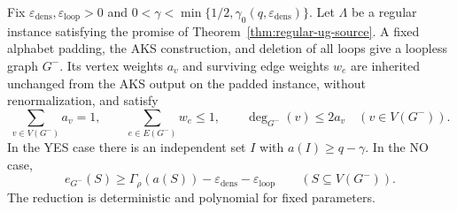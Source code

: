 \begin{lemma}\label{lem:aks-loop-removal}
Fix $\varepsilon_{\mathrm{dens}},\varepsilon_{\mathrm{loop}}>0$ and
$0<\gamma<\min\{1/2,\gamma_0(q,\varepsilon_{\mathrm{dens}})\}$.
Let $\Lambda$ be a regular instance satisfying the promise of
Theorem~\ref{thm:regular-ug-source}. A fixed alphabet padding,
the AKS construction, and deletion of all loops give a loopless
graph $G^-$. Its vertex weights $a_v$ and surviving edge weights $w_e$
are inherited unchanged from the AKS output on the padded instance,
without renormalization, and satisfy
\[
 \sum_{v\in V(G^-)}a_v=1,\qquad
 \sum_{e\in E(G^-)}w_e\le1,\qquad
 \deg_{G^-}(v)\le2a_v\quad(v\in V(G^-)).
\]
In the YES case there is an independent set $I$ with
$a(I)\geq q-\gamma$. In the NO case,
\begin{equation}\label{eq:aks-loop-free-density}
 e_{G^-}(S)\ge\Gamma_\rho(a(S))-\varepsilon_{\mathrm{dens}}-\varepsilon_{\mathrm{loop}}
 \qquad(S\subseteq V(G^-)).
\end{equation}
The reduction is deterministic and polynomial for fixed parameters.
\end{lemma}

